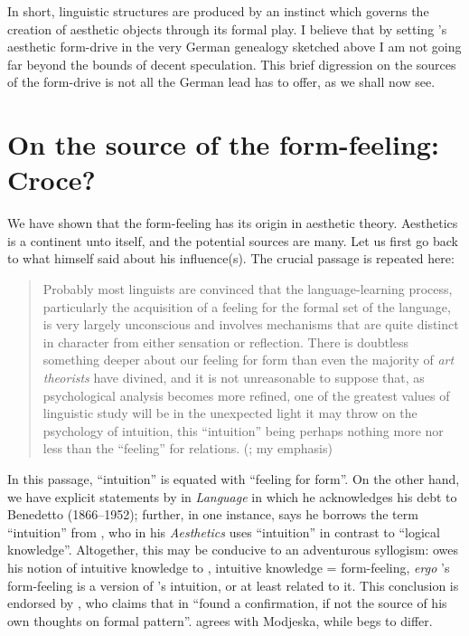 \documentclass[output=paper]{langscibook}
\begin{document}
In short, linguistic structures are produced by an instinct which governs the creation of aesthetic objects through its formal play. I believe that by setting {\Sapir}'s aesthetic form-drive in the very German genealogy sketched above I am not going far beyond the bounds of decent speculation. This brief digression on the sources of the form-drive is not all the German lead has to offer, as we shall now see.

\section{On the source of the form-feeling: Croce?}
\label{sec:fortis:croce}

We have shown that the form-feeling has its origin in aesthetic theory. Aesthetics is a continent unto itself, and the potential sources are many. Let us first go back to what {\Sapir} himself said about his influence(s). The crucial passage is repeated here:

\begin{quotation}
Probably most linguists are convinced that the language-learning process, particularly the acquisition of a feeling for the formal set of the language, is very largely unconscious and involves mechanisms that are quite distinct in character from either sensation or reflection. There is doubtless something deeper about our feeling for form than even the majority of \emph{art theorists} have divined, and it is not unreasonable to suppose that, as psychological analysis becomes more refined, one of the greatest values of linguistic study will be in the unexpected light it may throw on the psychology of intuition, this ``intuition'' being perhaps nothing more nor less than the ``feeling'' for relations. (\citealt[156]{Sapir1924}; my emphasis)
\end{quotation}

In this passage, ``intuition'' is equated with ``feeling for form''. On the other hand, we have explicit statements by {\Sapir} in \emph{Language} in which he acknowledges his debt to Benedetto {\Croce} (1866--1952); further, in one instance, \citet[224]{Sapir1921} says he borrows the term ``intuition'' from {\Croce}, who in his \emph{Aesthetics} uses ``intuition'' in contrast to ``logical knowledge''. Altogether, this may be conducive to an adventurous syllogism: {\Sapir} owes his notion of intuitive knowledge to {\Croce}, intuitive knowledge = form-feeling, \emph{ergo} {\Sapir}'s form-feeling is a version of {\Croce}'s intuition, or at least related to it. This conclusion is endorsed by \citet[347]{Modjeska1968}, who claims that in {\Croce} {\Sapir} ``found a confirmation, if not the source of his own thoughts on formal pattern''. \citet{Hymes1969} agrees with Modjeska, while \citet{Hall1969} begs to differ.
\end{document}
